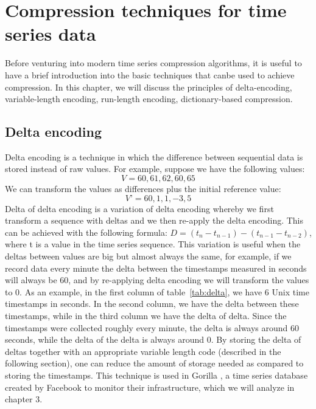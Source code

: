 
\chapter{Compression techniques for time series data}
Before venturing into modern time series compression algorithms, it is useful to have a brief
introduction into the basic techniques that canbe used to achieve compression. In this chapter,
we will discuss the principles of delta-encoding, variable-length encoding, run-length encoding,
dictionary-based compression.

\section{Delta encoding}
Delta encoding is a technique in which the difference between sequential data is stored instead
of raw values. For example, suppose we have the following values:
$$V= 60, 61, 62, 60, 65$$
We can transform the values as differences plus the initial reference value:
$$V’= 60, 1, 1, -3, 5$$
Delta of delta encoding is a variation of delta encoding whereby we first transform a sequence
with deltas and we then re-apply the delta encoding. This can be achieved with the following
formula: $D = (t_{n} - t_{n-1}) - (t_{n-1} - t_{n-2})$, where t is a value in the time series
sequence. This variation is useful when the deltas between values are big but almost always
the same, for example, if we record data every minute the delta between the timestamps measured
in seconds will always be 60, and by re-applying delta encoding we will transform the values
to 0. As an example, in the first column of table~\ref{tab:delta}, we have 6 Unix time timestamps
in seconds. In the second column, we have the delta between these timestamps, while in the
third column we have the delta of delta.
Since the timestamps were collected roughly every minute, the delta is always around 60 seconds,
while the delta of the delta is always around 0. By storing the delta of deltas together with
an appropriate variable length code (described in the following section), one can reduce the
amount of storage needed as compared to storing the timestamps.
This technique is used in Gorilla \cite{Pelkonen2015Gorilla}, a time series database created
by Facebook to monitor their infrastructure, which we will analyze in chapter 3.


